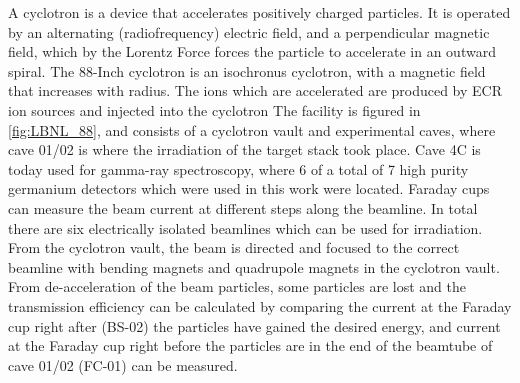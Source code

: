 \noindent 
A cyclotron is a device that accelerates positively charged particles. It is operated by an alternating (radiofrequency) electric field, and a perpendicular magnetic field, which by the Lorentz Force forces the particle to accelerate in an outward spiral. The 88-Inch cyclotron is an isochronus cyclotron, with a magnetic field that increases with radius. The ions which are accelerated are produced by ECR ion sources and injected into the cyclotron %
The facility is figured in \ref{fig:LBNL_88}, and consists of a cyclotron vault and experimental caves, where cave 01/02 is where the irradiation of the target stack took place. Cave 4C is today used for gamma-ray spectroscopy, where 6 of a total of 7 high purity germanium detectors which were used in this work were located. Faraday cups can measure the beam current at different steps along the beamline. In total there are six electrically isolated beamlines which can be used for irradiation. %
From the cyclotron vault, the beam is directed and focused to the correct beamline with bending magnets and quadrupole magnets in the cyclotron vault. From de-acceleration of the beam particles, some particles are lost and the transmission efficiency can be calculated by comparing the current at the Faraday cup right after (BS-02) the particles have gained the desired energy, and current at the Faraday cup right before the particles are in the end of the beamtube of cave 01/02 (FC-01) can be measured.  



